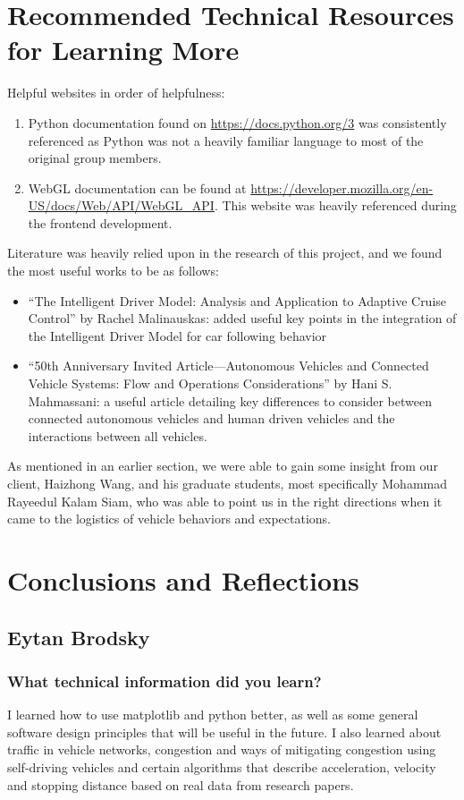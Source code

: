 \documentclass[onecolumn, draftclsnofoot,10pt, compsoc]{IEEEtran}
\begin{document}
\section{Recommended Technical Resources for Learning More}
Helpful websites in order of helpfulness:
\begin{enumerate}
\item
Python documentation found on \url{https://docs.python.org/3} was consistently referenced as Python was not a heavily familiar language to most of the original group members.
\item
WebGL documentation can be found at \url{https://developer.mozilla.org/en-US/docs/Web/API/WebGL_API}.
This website was heavily referenced during the frontend development.
\end{enumerate}
Literature was heavily relied upon in the research of this project, and we found the most useful works to be as follows:
\begin{itemize}
\item
“The Intelligent Driver Model: Analysis and Application to Adaptive Cruise Control” by Rachel Malinauskas: added useful key points in the integration of the Intelligent Driver Model for car following behavior
\item
“50th Anniversary Invited Article—Autonomous Vehicles and Connected Vehicle Systems: Flow and Operations Considerations” by Hani S. Mahmassani: a useful article detailing key differences to consider between connected autonomous vehicles and human driven vehicles and the interactions between all vehicles.
\end{itemize}
As mentioned in an earlier section, we were able to gain some insight from our client, Haizhong Wang, and his graduate students, most specifically Mohammad Rayeedul Kalam Siam, who was able to point us in the right directions when it came to the logistics of vehicle behaviors and expectations.
\section{Conclusions and Reflections}
\subsection{Eytan Brodsky}
\subsubsection{What technical information did you learn?}
I learned how to use matplotlib and python better, as well as some general software design principles that will be useful in the future.
I also learned about traffic in vehicle networks, congestion and ways of mitigating congestion using self-driving vehicles and certain algorithms that describe acceleration, velocity and stopping distance based on real data from research papers.
\end{document}
